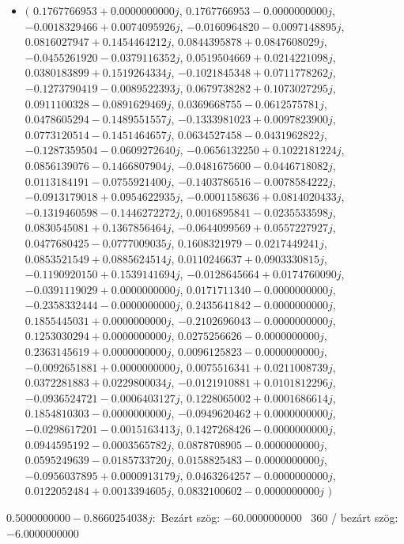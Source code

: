 \documentclass[14pt,a4paper]{article}
\begin{document}
\begin{itemize}
\item
$\big($
$0.1767766953+0.0000000000j$, $0.1767766953-0.0000000000j$, $-0.0018329466+0.0074095926j$, $-0.0160964820-0.0097148895j$, $0.0816027947+0.1454464212j$, $0.0844395878+0.0847608029j$, $-0.0455261920-0.0379116352j$, $0.0519504669+0.0214221098j$, $0.0380183899+0.1519264334j$, $-0.1021845348+0.0711778262j$, $-0.1273790419-0.0089522393j$, $0.0679738282+0.1073027295j$, $0.0911100328-0.0891629469j$, $0.0369668755-0.0612575781j$, $0.0478605294-0.1489551557j$, $-0.1333981023+0.0097823900j$, $0.0773120514-0.1451464657j$, $0.0634527458-0.0431962822j$, $-0.1287359504-0.0609272640j$, $-0.0656132250+0.1022181224j$, $0.0856139076-0.1466807904j$, $-0.0481675600-0.0446718082j$, $0.0113184191-0.0755921400j$, $-0.1403786516-0.0078584222j$, $-0.0913179018+0.0954622935j$, $-0.0001158636+0.0814020433j$, $-0.1319460598-0.1446272272j$, $0.0016895841-0.0235533598j$, $0.0830545081+0.1367856464j$, $-0.0644099569+0.0557227927j$, $0.0477680425-0.0777009035j$, $0.1608321979-0.0217449241j$, $0.0853521549+0.0885624514j$, $0.0110246637+0.0903330815j$, $-0.1190920150+0.1539141694j$, $-0.0128645664+0.0174760090j$, $-0.0391119029+0.0000000000j$, $0.0171711340-0.0000000000j$, $-0.2358332444-0.0000000000j$, $0.2435641842-0.0000000000j$, $0.1855445031+0.0000000000j$, $-0.2102696043-0.0000000000j$, $0.1253030294+0.0000000000j$, $0.0275256626-0.0000000000j$, $0.2363145619+0.0000000000j$, $0.0096125823-0.0000000000j$, $-0.0092651881+0.0000000000j$, $0.0075516341+0.0211008739j$, $0.0372281883+0.0229800034j$, $-0.0121910881+0.0101812296j$, $-0.0936524721-0.0006403127j$, $0.1228065002+0.0001686614j$, $0.1854810303-0.0000000000j$, $-0.0949620462+0.0000000000j$, $-0.0298617201-0.0015163413j$, $0.1427268426-0.0000000000j$, $0.0944595192-0.0003565782j$, $0.0878708905-0.0000000000j$, $0.0595249639-0.0185733720j$, $0.0158825483-0.0000000000j$, $-0.0956037895+0.0000913179j$, $0.0463264257-0.0000000000j$, $0.0122052484+0.0013394605j$, $0.0832100602-0.0000000000j$
$\big)$
\end{itemize}
$0.5000000000-0.8660254038j$:\
Bezárt szög: $-60.0000000000$ \
360 / bezárt szög: $-6.0000000000$\
\end{document}
